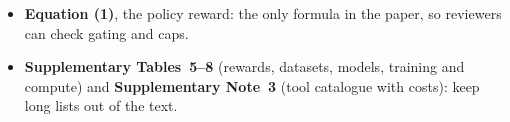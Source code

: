 \artefacts
\begin{itemize}
\item \textbf{Equation (1)}, the policy reward: the only formula in the paper, so reviewers can check
gating and caps.
\item \textbf{Supplementary Tables~5--8} (rewards, datasets, models, training and compute) and
\textbf{Supplementary Note~3} (tool catalogue with costs): keep long lists out of the text.
\end{itemize}

